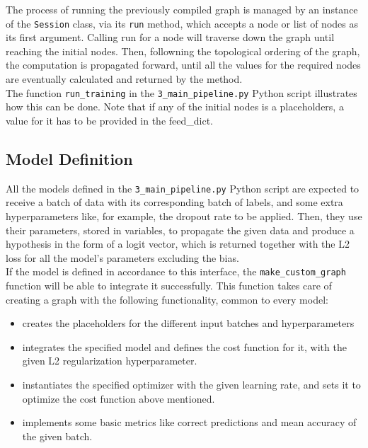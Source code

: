   The process of running the previously compiled graph is managed by an instance of the \texttt{Session} class, via its \texttt{run} method, which accepts a node or list of nodes as its first argument. Calling run for a node will traverse down the graph until reaching the initial nodes. Then, followning the topological ordering of the graph, the computation is propagated forward, until all the values for the required nodes are eventually calculated and returned by the method.\\

  The function \texttt{run\_training}  in the \texttt{3\_main\_pipeline.py} Python script illustrates how this can be done. Note that if any of the initial nodes is a placeholders, a value for it has to be provided in the feed\_dict.


  \subsection{Model Definition}

  All the models defined in the \texttt{3\_main\_pipeline.py} Python script are expected to receive a batch of data with its corresponding batch of labels, and some extra hyperparameters like, for example, the dropout rate to be applied. Then, they use their parameters, stored in variables, to propagate the given data and produce a hypothesis in the form of a logit vector, which is returned together with the L2 loss for all the model's parameters excluding the bias.\\

  If the model is defined in accordance to this interface, the \texttt{make\_custom\_graph} function will be able to integrate it successfully. This function takes care of creating a graph with the following functionality, common to every model:

  \begin{itemize}
  \item creates the placeholders for the different input batches and hyperparameters
  \item integrates the specified model and defines the cost function for it, with the given L2 regularization hyperparameter.
  \item instantiates the specified optimizer with the given learning rate, and sets it to optimize the cost function above mentioned.
  \item implements some basic metrics like correct predictions and mean accuracy of the given batch.
  \end{itemize}

